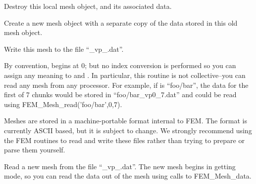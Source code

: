 
Destroy this local mesh object, and its associated
data.



Create a new mesh object with a separate copy of the data 
stored in this old mesh object.



Write this mesh to the file ``\_vp\_.dat''.

By convention,  begins at 0; but no index conversion is
performed so you can assign any meaning to  and .
In particular, this routine is not collective--you can read any
mesh from any processor.
For example, if  is ``foo/bar'', the data for the 
first of 7 chunks would be stored in ``foo/bar\_vp0\_7.dat''
and could be read using FEM\_Mesh\_read('foo/bar',0,7).

Meshes are stored in a machine-portable format internal to FEM.
The format is currently ASCII based, but it is subject to change.
We strongly recommend using the FEM routines to read and write 
these files rather than trying to prepare or parse them yourself.



Read a new mesh from the file ``\_vp\_.dat''.
The new mesh begins in getting mode, so you can read the 
data out of the mesh using calls to FEM\_Mesh\_data.




